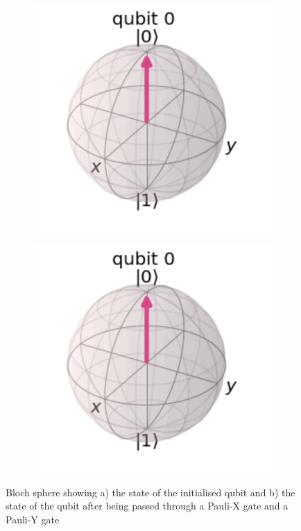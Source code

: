 \begin{figure}[h]
    \centering
    \begin{subfigure}[h]{0.33\textwidth}
        \centering
        \includegraphics[width=\textwidth]{lab2/images/bSphX1.png}
        \caption{}
        \label{fig:bSphXY1}
    \end{subfigure}
    \hspace{0.2\textwidth}
    \begin{subfigure}[h]{0.33\textwidth}
        \centering
        \includegraphics[width=\textwidth]{lab2/images/bSphX1.png}
        \caption{}
        \label{fig:bSphXY2}
    \end{subfigure}
    \caption{Bloch sphere showing a) the state of the initialised qubit and b) the state of the qubit after being passed through a Pauli-X gate and a Pauli-Y gate} 
    \label{fig:xyGateBloc}
\end{figure}

